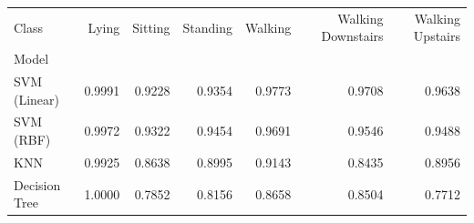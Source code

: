 \begin{tabular}{lrrrrrr}
\toprule
Class & Lying & Sitting & Standing & Walking & Walking Downstairs & Walking Upstairs \\
Model &  &  &  &  &  &  \\
\midrule
SVM (Linear) & 0.9991 & 0.9228 & 0.9354 & 0.9773 & 0.9708 & 0.9638 \\
SVM (RBF) & 0.9972 & 0.9322 & 0.9454 & 0.9691 & 0.9546 & 0.9488 \\
KNN & 0.9925 & 0.8638 & 0.8995 & 0.9143 & 0.8435 & 0.8956 \\
Decision Tree & 1.0000 & 0.7852 & 0.8156 & 0.8658 & 0.8504 & 0.7712 \\
\bottomrule
\end{tabular}
